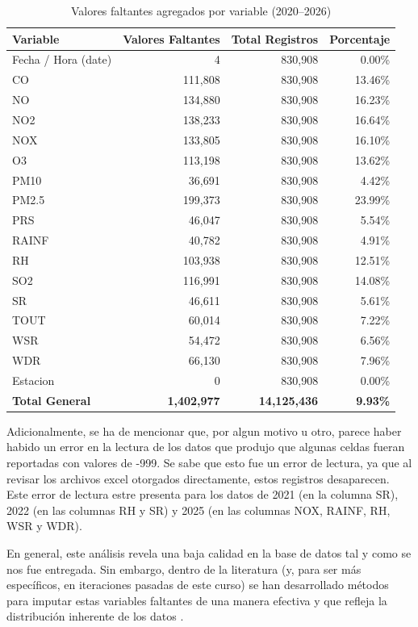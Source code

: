 \documentclass[11pt]{article}
\begin{document}
\begin{table}[htbp]
\centering
\caption{Valores faltantes agregados por variable (2020--2026)}
\label{tab:missing_by_variable}
\begin{tabular}{lrrr}
\hline
\textbf{Variable} & \textbf{Valores Faltantes} & \textbf{Total Registros} & \textbf{Porcentaje} \\
\hline
Fecha / Hora (date) & 4 & 830,908 & 0.00\% \\
CO & 111,808 & 830,908 & 13.46\% \\
NO & 134,880 & 830,908 & 16.23\% \\
NO2 & 138,233 & 830,908 & 16.64\% \\
NOX & 133,805 & 830,908 & 16.10\% \\
O3 & 113,198 & 830,908 & 13.62\% \\
PM10 & 36,691 & 830,908 & 4.42\% \\
PM2.5 & 199,373 & 830,908 & 23.99\% \\
PRS & 46,047 & 830,908 & 5.54\% \\
RAINF & 40,782 & 830,908 & 4.91\% \\
RH & 103,938 & 830,908 & 12.51\% \\
SO2 & 116,991 & 830,908 & 14.08\% \\
SR & 46,611 & 830,908 & 5.61\% \\
TOUT & 60,014 & 830,908 & 7.22\% \\
WSR & 54,472 & 830,908 & 6.56\% \\
WDR & 66,130 & 830,908 & 7.96\% \\
Estacion & 0 & 830,908 & 0.00\% \\
\hline
\textbf{Total General} & \textbf{1,402,977} & \textbf{14,125,436} & \textbf{9.93\%} \\
\hline
\end{tabular}
\end{table}

Adicionalmente, se ha de mencionar que, por algun motivo u otro, parece haber habido un error en la lectura de los datos que produjo que algunas celdas fueran reportadas con valores de -999. Se sabe que esto fue un error de lectura, ya que al revisar los archivos excel otorgados directamente, estos registros desaparecen. Este error de lectura estre presenta para los datos de 2021 (en la columna SR), 2022 (en las columnas RH y SR) y 2025 (en las columnas NOX, RAINF, RH, WSR y WDR).

En general, este análisis revela una baja calidad en la base de datos tal y como se nos fue entregada. Sin embargo, dentro de la literatura (y, para ser más específicos, en iteraciones pasadas de este curso) se han desarrollado métodos para imputar estas variables faltantes de una manera efectiva y que refleja la distribución inherente de los datos \citep{gomezsantos2027hybrid}.
\end{document}
